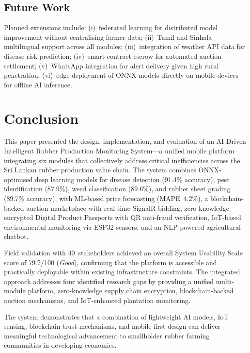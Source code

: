 \documentclass[10pt, conference]{IEEEtran}
\begin{document}
\subsection{Future Work}

Planned extensions include: (i)~federated learning for distributed
model improvement without centralising farmer data;
(ii)~Tamil and Sinhala multilingual support across all modules;
(iii)~integration of weather API data for disease risk prediction;
(iv)~smart contract escrow for automated auction settlement;
(v)~WhatsApp integration for alert delivery given high rural
penetration; (vi)~edge deployment of ONNX models directly on
mobile devices for offline AI inference.

\section{Conclusion}

This paper presented the design, implementation, and evaluation of an
AI Driven Intelligent Rubber Production Monitoring System---a unified
mobile platform integrating six modules that collectively address
critical inefficiencies across the Sri Lankan rubber production value
chain. The system combines ONNX-optimised deep learning models for
disease detection (91.4\% accuracy), pest identification (87.9\%),
weed classification (89.6\%), and rubber sheet grading (89.7\%
accuracy), with ML-based price forecasting (MAPE~4.2\%), a
blockchain-backed auction marketplace with real-time SignalR bidding,
zero-knowledge encrypted Digital Product Passports with QR anti-fraud
verification, IoT-based environmental monitoring via ESP32 sensors,
and an NLP-powered agricultural chatbot.

Field validation with 40~stakeholders achieved an overall System
Usability Scale score of 79.2/100 (\textit{Good}), confirming that
the platform is accessible and practically deployable within existing
infrastructure constraints. The integrated approach addresses four
identified research gaps by providing a unified multi-module platform,
zero-knowledge supply chain encryption, blockchain-backed auction
mechanisms, and IoT-enhanced plantation monitoring.

The system demonstrates that a combination of lightweight AI models,
IoT sensing, blockchain trust mechanisms, and mobile-first design
can deliver meaningful technological advancement to smallholder
rubber farming communities in developing economies.
\end{document}
